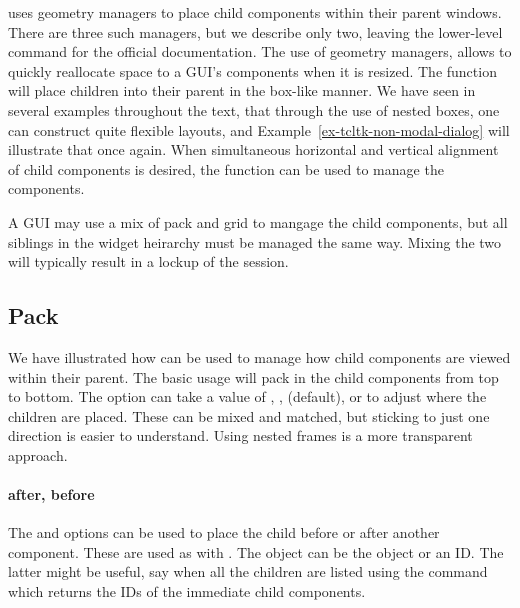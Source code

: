 \TCL\/ uses geometry managers to place child components within their
parent windows. There are three such managers, but we describe only
two, leaving the lower-level  command for the official documentation. The use of
geometry managers, allows \TK\/ to quickly reallocate space to a GUI's
components when it is resized.  The  function will
place children into their parent in the box-like manner. We have seen
in several examples throughout the text, that through the use of
nested boxes, one can construct quite flexible layouts, and
Example~\ref{ex-tcltk-non-modal-dialog} will illustrate that once
again. When simultaneous horizontal and vertical alignment of child
components is desired, the  function can be used to
manage the components.

A GUI may use a mix of pack and grid to mangage the child components,
but all siblings in the widget heirarchy must be managed the same
way. Mixing the two will typically result in a lockup of the \R\/
session.


\subsection{Pack}
\label{sec:tcltk:pack}


We have illustrated how  can be used to manage how
child components are viewed within their parent. The basic usage
 will pack in the child components from top to
bottom. The  option can take a value of
, ,  (default), or 
to adjust where the children are placed. These can be mixed and
matched, but sticking to just one direction is easier to
understand. Using nested frames is a more transparent approach.

\paragraph{after, before}
The  and  options can be
used to place the child before or after another component. These are
used as with . The object
 can be the \R\/ object or an ID. The latter might be
useful, say when all the children are listed using the command
 which returns the IDs of the
immediate child components.

